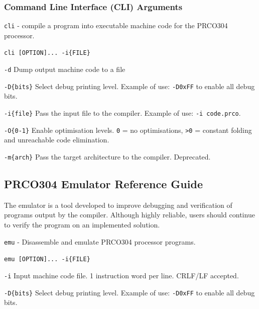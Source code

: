 \documentclass[11pt,a4paper]{report}
\newcommand{\scname}{PRCO304}
\begin{document}
\subsubsection*{Command Line Interface (CLI) Arguments}
\label{sect:compiler_cli}
\begin{description}[style=nextline]
\item [Name]
\verb|cli| - compile a program into executable machine code for the \scname{} processor.

\item[Synopsis]
\verb|cli [OPTION]... -i{FILE}|

\item [Description]
\verb|-d| Dump output machine code to a file

\verb|-D{bits}| Select debug printing level. Example of use: \verb|-D0xFF| to enable all debug bits. 

\verb|-i{file}| Pass the input file to the compiler. Example of use: \verb|-i code.prco|.

\verb|-O{0-1}| Enable optimisation levels. \verb|0| = no optimisations, \verb|>0| = constant folding and unreachable code elimination.

\verb|-m{arch}| Pass the target architecture to the compiler. Deprecated.

\end{description}

\newpage
\subsection{\scname{} Emulator Reference Guide}
The emulator is a tool developed to improve debugging and verification of programs output by the compiler. Although highly reliable, users should continue to verify the program on an implemented solution.

\label{sect:emulator_cli}
\begin{description}[style=nextline]
\item [Name]
\verb|emu| - Disassemble and emulate \scname{} processor programs.

\item[Synopsis]
\verb|emu [OPTION]... -i{FILE}|

\item [Description]
\verb|-i| Input machine code file. 1 instruction word per line. CRLF/LF accepted.

\verb|-D{bits}| Select debug printing level. Example of use: \verb|-D0xFF| to enable all debug bits. 
\end{description}
\end{document}
